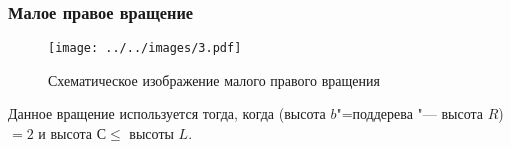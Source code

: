 \begin{frame}
    \frametitle{Малое правое вращение}

    \begin{figure}[ht]
        \texttt{[image: ../../images/3.pdf]}
        
        \caption{Схематическое изображение малого правого вращения}
    \end{figure}

    Данное вращение используется тогда,
    когда (высота $b$"=поддерева "--- высота $R$)
    $= 2$ и высота $С \leqslant $ высоты $L$.
\end{frame}